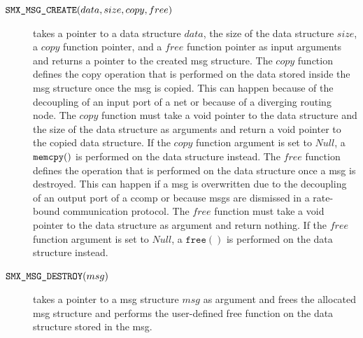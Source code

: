 \begin{description}
    \item[$\textnormal{\tt SMX\_MSG\_CREATE}(data, size, copy, free)$] takes a pointer to a data structure $data$, the size of the data structure $size$, a $copy$ function pointer, and a $free$ function pointer as input arguments and returns a pointer to the created \gls*{msg} structure.
        The $copy$ function defines the copy operation that is performed on the data stored inside the \gls*{msg} structure once the \gls*{msg} is copied.
        This can happen because of the decoupling of an input port of a net or because of a diverging routing node.
        The $copy$ function must take a void pointer to the data structure and the size of the data structure as arguments and return a void pointer to the copied data structure.
        If the $copy$ function argument is set to $Null$, a $\textnormal{\tt memcpy}()$ is performed on the data structure instead.
        The $free$ function defines the operation that is performed on the data structure once a \gls*{msg} is destroyed.
        This can happen if a \gls*{msg} is overwritten due to the decoupling of an output port of a \gls*{ccomp} or because \glspl*{msg} are dismissed in a rate-bound communication protocol.
        The $free$ function must take a void pointer to the data structure as argument and return nothing.
        If the $free$ function argument is set to $Null$, a $\texttt{free}()$ is performed on the data structure instead.
    \item[$\textnormal{\tt SMX\_MSG\_DESTROY}(msg)$] takes a pointer to a \gls*{msg} structure $msg$ as argument and frees the allocated \gls*{msg} structure and performs the user-defined free function on the data structure stored in the \gls*{msg}.
\end{description}

